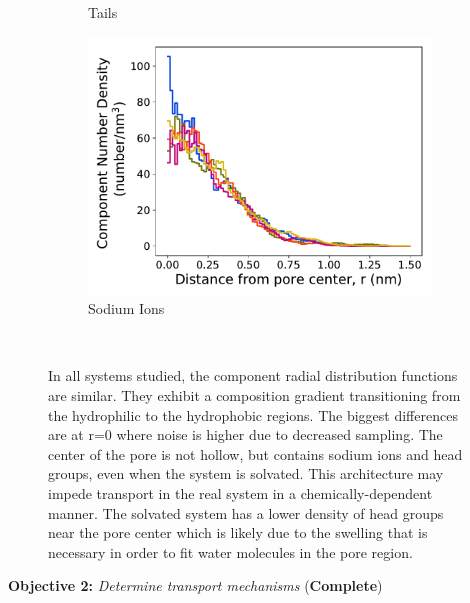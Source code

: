 \documentclass{article}
\begin{document}
\begin{figure}[!htb]
\begin{subfigure}{0.32\textwidth}
        \caption{Tails}
        \label{fig:tails_regional_density}
  \end{subfigure}
  \begin{subfigure}{0.32\textwidth}
        \includegraphics[width=1\linewidth]{sodium_density.pdf}
        \caption{Sodium Ions}
        \label{fig:sodium_regional_density}
  \end{subfigure}
  \caption{In all systems studied, the component radial distribution functions are similar.
      They exhibit a composition gradient transitioning from the hydrophilic to the hydrophobic
          regions. The biggest differences are at r=0 where noise is higher due to
          decreased sampling. The center of the pore is not hollow, but contains sodium ions and
          head groups, even when the system is solvated. This architecture may impede transport in
          the real system in a chemically-dependent manner.
          The solvated system has a lower density of head groups near the
          pore center which is likely due to the swelling that is necessary in order to fit water
          molecules in the pore region.}~\label{fig:overlaid_densities}
  \vspace{-0.5cm}
  \end{figure}
  
  \noindent \textbf{\large Objective 2:} \textit{\large Determine transport mechanisms} (\textcolor{green!40!olive}{\textbf{Complete}})
  
\end{document}
